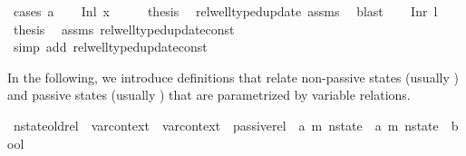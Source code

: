 \begin{isabellebody}
%
\endisadelimproof
%
\isatagproof
{}\isamarkupfalse%
\ {\isacharparenleft}{\kern0pt}cases\ a{\isacharparenright}{\kern0pt}\isanewline
\ \ \isamarkupfalse%
\ {\isacharparenleft}{\kern0pt}Inl\ x{\isacharparenright}{\kern0pt}\isanewline
\ \ \isamarkupfalse%
\ \isamarkupfalse%
\ {\isacharquery}{\kern0pt}thesis\ \isamarkupfalse%
\ rel{\isacharunderscore}{\kern0pt}well{\isacharunderscore}{\kern0pt}typed{\isacharunderscore}{\kern0pt}update\ assms\ \isamarkupfalse%
\ blast\isanewline
{}\isamarkupfalse%
\isanewline
\ \ \isamarkupfalse%
\ {\isacharparenleft}{\kern0pt}Inr\ l{\isacharparenright}{\kern0pt}\isanewline
\ \ \isamarkupfalse%
\ {\isacharquery}{\kern0pt}thesis\ \isamarkupfalse%
\ assms\ rel{\isacharunderscore}{\kern0pt}well{\isacharunderscore}{\kern0pt}typed{\isacharunderscore}{\kern0pt}update{\isacharunderscore}{\kern0pt}const\isanewline
\ \ \ \ \isamarkupfalse%
\ {\isacharparenleft}{\kern0pt}simp\ add{\isacharcolon}{\kern0pt}\ rel{\isacharunderscore}{\kern0pt}well{\isacharunderscore}{\kern0pt}typed{\isacharunderscore}{\kern0pt}update{\isacharunderscore}{\kern0pt}const{\isacharparenright}{\kern0pt}\isanewline
{}\isamarkupfalse%
%
\endisatagproof
{\isafoldproof}%
%
\isadelimproof
%
\endisadelimproof
%
\isadelimdocument
%
\endisadelimdocument
%
\isatagdocument
%
\isamarkuptrue%
%
\endisatagdocument
{\isafolddocument}%
%
\isadelimdocument
%
\endisadelimdocument
%
\begin{isamarkuptext}%
In the following, we introduce definitions that relate non-passive states (usually ) 
and passive states (usually ) that are parametrized by variable relations.%
\end{isamarkuptext}\isamarkuptrue%
\isamarkupfalse%
\ nstate{\isacharunderscore}{\kern0pt}old{\isacharunderscore}{\kern0pt}rel\ {\isacharcolon}{\kern0pt}{\isacharcolon}{\kern0pt}\ {\isachardoublequoteopen}var{\isacharunderscore}{\kern0pt}context\ {\isasymRightarrow}\ var{\isacharunderscore}{\kern0pt}context\ {\isasymRightarrow}\ passive{\isacharunderscore}{\kern0pt}rel\ {\isasymRightarrow}\ {\isacharparenleft}{\kern0pt}{\isacharprime}{\kern0pt}a{\isacharcomma}{\kern0pt}\ {\isacharprime}{\kern0pt}m{\isacharparenright}{\kern0pt}\ nstate\ {\isasymRightarrow}\ {\isacharparenleft}{\kern0pt}{\isacharprime}{\kern0pt}a{\isacharcomma}{\kern0pt}\ {\isacharprime}{\kern0pt}m{\isacharparenright}{\kern0pt}\ nstate\ {\isasymRightarrow}\ bool{\isachardoublequoteclose}\isanewline

\end{isabellebody}
